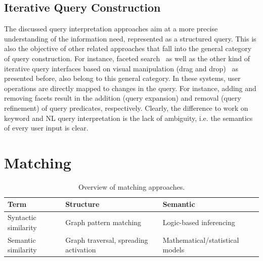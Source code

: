 

\subsection{Iterative Query Construction}

The discussed query interpretation approaches 
aim at a more precise understanding of the information need, represented as a structured query. This is also the objective of other related approaches that fall into the general category of query construction. For instance, faceted search~\cite{DBLP:conf/dexa/WagnerLT11,DBLP:conf/esws/HeimEZ10,DBLP:conf/semweb/FerreH11} as well as the other kind of iterative query interfaces based on visual manipulation (drag and drop)~\cite{DBLP:journals/ws/Harth10} as presented before, also belong to this general category. In these systems, user operations are directly mapped to changes in the query. For instance, adding and removing facets result in the addition (query expansion) and removal (query refinement) of query predicates, respectively. Clearly, the difference to work on keyword and NL query interpretation is the lack of ambiguity, i.e. the semantics of every user input is clear. 
	
\section{Matching}\label{sec:matching}
\begin{table}[htbp]
  \centering
  \caption{Overview of matching approaches.}
    \begin{tabular}{|p{2.2cm}|p{2.7cm}|p{2.5cm}|}
    \hline
    \textbf{Term} & \textbf{Structure} & \textbf{Semantic} \bigstrut\\
    \hline
    \hline
    Syntactic similarity & Graph pattern matching  & Logic-based inferencing \bigstrut\\
    \hline
    Semantic similarity & Graph traversal, spreading activation & Mathematical/statistical models\bigstrut\\
    \hline
    \end{tabular}%
  \label{tab:matching}%
\end{table}%

